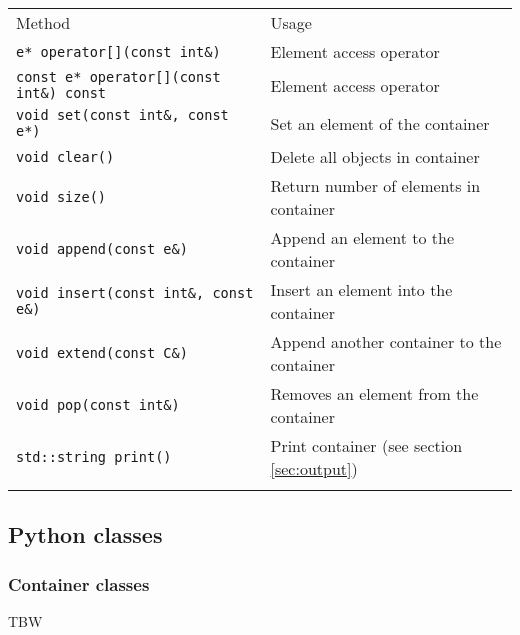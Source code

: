 \documentclass{article}[12pt,a4]
\begin{document}
\begin{center}
\begin{tabular}{ll}
\hline
\hline
\noalign{\smallskip}
Method & Usage \\
\noalign{\smallskip}
\hline
\noalign{\smallskip}
{\tt e* operator[](const int\&)} & Element access operator \\
{\tt const e* operator[](const int\&) const} & Element access operator \\
{\tt void set(const int\&, const e*)} & Set an element of the container \\
{\tt void clear()} & Delete all objects in container \\
{\tt void size()} & Return number of elements in container \\
{\tt void append(const e\&)} & Append an element to the container \\
{\tt void insert(const int\&, const e\&)} & Insert an element into the container \\
{\tt void extend(const C\&)} & Append another container to the container \\
{\tt void pop(const int\&)} & Removes an element from the container \\
{\tt std::string print()} & Print container (see section \ref{sec:output}) \\
\noalign{\smallskip}
\hline
\end{tabular}
\end{center}


\subsection{Python classes}

\subsubsection{Container classes}

TBW
\end{document}
